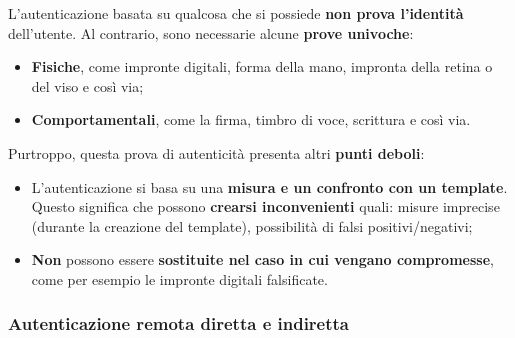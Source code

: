 \documentclass[a4paper]{article}
\begin{document}
	L'autenticazione basata su qualcosa che si possiede \textbf{non prova l'identità} dell'utente. Al contrario, sono necessarie alcune \textbf{prove univoche}:
	\begin{itemize}
		\item \textcolor{Red3}{\textbf{Fisiche}}, come impronte digitali, forma della mano, impronta della retina o del viso e così via;
		
		\item \textcolor{Red3}{\textbf{Comportamentali}}, come la firma, timbro di voce, scrittura e così via.
	\end{itemize}
	Purtroppo, questa prova di autenticità presenta altri \textbf{punti deboli}:
	\begin{itemize}
		\item L'autenticazione si basa su una \textbf{misura e un confronto con un template}. Questo significa che possono \textbf{crearsi inconvenienti} quali: misure imprecise (durante la creazione del template), possibilità di falsi positivi/negativi;
		
		\item \textbf{Non} possono essere \textbf{sostituite nel caso in cui vengano compromesse}, come per esempio le impronte digitali falsificate.
	\end{itemize}\newpage
	
	\subsubsection{Autenticazione remota diretta e indiretta}
	
\end{document}

